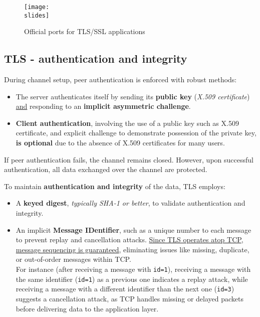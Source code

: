 \begin{figure}[h]
    \centering
    \texttt{[image: \\slides]}
    \caption{Official ports for TLS/SSL applications}
\end{figure}


\subsection{TLS - authentication and integrity}
During channel setup, peer authentication is enforced with robust methods:

\begin{itemize}
    \item The server authenticates itself by sending its \textbf{public key} (\textit{X.509 certificate}) \underline{and} responding to an \textbf{implicit asymmetric challenge}.
    \item \textbf{Client authentication}, involving the use of a public key such as X.509 certificate, and explicit challenge to demonstrate possession of the private key, \textbf{is optional} due to the absence of X.509 certificates for many users.
\end{itemize}
If peer authentication fails, the channel remains closed. However, upon successful authentication, all data exchanged over the channel are protected.

To maintain \textbf{authentication and integrity} of the data, TLS employs:
\begin{itemize}
    \item A \textbf{keyed digest}, \textit{typically SHA-1 or better}, to validate authentication and integrity.
    \item An implicit \textbf{Message IDentifier}, such as a unique number to each message to prevent replay and cancellation attacks. \ul{Since TLS operates atop TCP}, \ul{message sequencing is guaranteed}, eliminating issues like missing, duplicate, or out-of-order messages within TCP.\\
          For instance (after receiving a message with \texttt{id=1}), receiving a message with the same identifier (\texttt{id=1}) as a previous one indicates a replay attack, while receiving a message with a different identifier than the next one (\texttt{id=3}) suggests a cancellation attack, as TCP handles missing or delayed packets before delivering data to the application layer.
\end{itemize}



